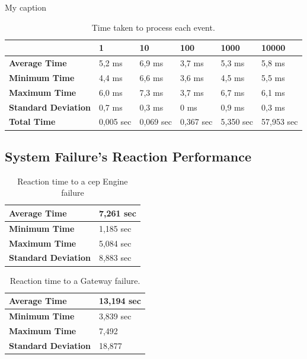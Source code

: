 \begin{table}[H]
	\centering
	\caption{My caption}
	\label{my-label}
	\begin{tabular}{l|l|l|l|l|l|}
		\cline{2-6}
		& \textbf{1} & \textbf{10} & \textbf{100} & \textbf{1000} & \textbf{10000} \\ \hline
		\multicolumn{1}{|l|}{\textbf{Average Time}}       & 5,2 ms     & 6,9 ms      & 3,7 ms       & 5,3 ms        & 5,8 ms         \\ \hline
		\multicolumn{1}{|l|}{\textbf{Minimum Time}}       & 4,4 ms     & 6,6 ms      & 3,6 ms       & 4,5 ms        & 5,5 ms         \\ \hline
		\multicolumn{1}{|l|}{\textbf{Maximum Time}}       & 6,0 ms     & 7,3 ms      & 3,7 ms       & 6,7 ms        & 6,1 ms         \\ \hline
		\multicolumn{1}{|l|}{\textbf{Standard Deviation}} & 0,7 ms     & 0,3 ms      & 0 ms         & 0,9 ms        & 0,3 ms         \\ \hline
		\multicolumn{1}{|l|}{\textbf{Total Time}}         & 0,005 sec  & 0,069 sec   & 0,367 sec    & 5,350 sec     & 57,953 sec     \\ \hline
	\end{tabular}
	\centering
\caption{Time taken to process each event.}
\label{table:event}
\end{table}

\subsection{System Failure's Reaction Performance}
\label{results:fail}

\begin{table}[H]
	
	\begin{tabular}{|l|l|}
		\hline
		\textbf{Average Time}       & 7,261 sec \\ \hline
		\textbf{Minimum Time}       & 1,185 sec \\ \hline
		\textbf{Maximum Time}       & 5,084 sec \\ \hline
		\textbf{Standard Deviation} & 8,883 sec \\ \hline
	\end{tabular}
	\centering
	\caption{Reaction time to a \ac{cep} Engine failure}
	\label{cepDown}
\end{table}

\begin{table}[H]

	\begin{tabular}{|l|l|}
		\hline
		\textbf{Average Time}       & 13,194 sec \\ \hline
		\textbf{Minimum Time}       & 3,839 sec \\ \hline
		\textbf{Maximum Time}       & 7,492 \\ \hline
		\textbf{Standard Deviation} & 18,877 \\ \hline
	\end{tabular}
	\centering
	\caption{Reaction time to a Gateway failure.}
	\label{gwdown}
\end{table}

